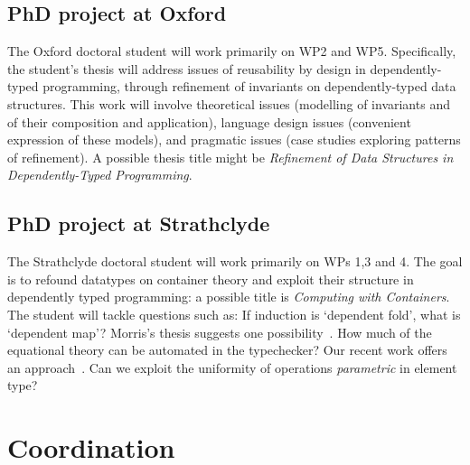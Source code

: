 \documentclass[a4paper]{article}
\begin{document}


\subsection*{PhD project at Oxford}
\label{sec:phd-project-at}

The Oxford doctoral student will work primarily on WP2 and
WP5. Specifically, the student's thesis will address issues of
reusability by design in dependently-typed programming, through
refinement of invariants on dependently-typed data structures. This
work will involve theoretical issues (modelling of invariants and of
their composition and application), language design issues (convenient
expression of these models), and pragmatic issues (case studies
exploring patterns of refinement). A possible thesis title might be
\textit{Refinement of Data Structures in Dependently-Typed
  Programming}.

\subsection*{PhD project at Strathclyde}
\label{sec:phd-project-at-1}

The Strathclyde doctoral student will work primarily on WPs 1,3 and 4.
The goal is to refound datatypes on container
theory and exploit their structure in dependently typed
programming: a possible title is \textit{Computing with
  Containers}. The student will tackle questions such as: If induction
is `dependent fold', what is `dependent map'?  Morris's thesis
suggests one possibility~\cite{morris:PhD}. How much of the equational
theory can be automated in the typechecker? Our recent work offers an
approach~\cite{alti:ott-conf}. Can we exploit the uniformity of
operations \emph{parametric} in element type?


\section{Coordination}
\label{sec:coordination}
\end{document}

